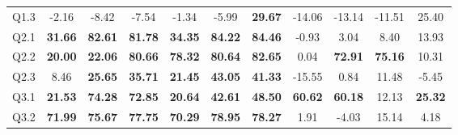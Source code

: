 \begin{table}
{\begin{tabular}{@{}ccccccccccc@{}}
    Q1.3                       & \multicolumn{1}{c}{-2.16}                     & \multicolumn{1}{c}{-8.42}                     & -7.54                     & \multicolumn{1}{c}{-1.34}                     & \multicolumn{1}{c}{-5.99}                     & \textbf{29.67}            & \multicolumn{1}{c}{-14.06}           & \multicolumn{1}{c}{-13.14}           & \multicolumn{1}{c}{-11.51}          & 25.40                           \\ 
    Q2.1                       & \multicolumn{1}{c}{\textbf{31.66}}            & \multicolumn{1}{c}{\textbf{82.61}}            & \textbf{81.78}            & \multicolumn{1}{c}{\textbf{34.35}}            & \multicolumn{1}{c}{\textbf{84.22}}            & \textbf{84.46}            & \multicolumn{1}{c}{-0.93}            & \multicolumn{1}{c}{3.04}             & \multicolumn{1}{c}{8.40}            & 13.93                           \\ 
    Q2.2                       & \multicolumn{1}{c}{\textbf{20.00}}            & \multicolumn{1}{c}{\textbf{22.06}}            & \textbf{80.66}            & \multicolumn{1}{c}{\textbf{78.32}}            & \multicolumn{1}{c}{\textbf{80.64}}            & \textbf{82.65}            & \multicolumn{1}{c}{0.04}             & \multicolumn{1}{c}{\textbf{72.91}}   & \multicolumn{1}{c}{\textbf{75.16}}  & 10.31                           \\ 
    Q2.3                       & \multicolumn{1}{c}{8.46}                      & \multicolumn{1}{c}{\textbf{25.65}}            & \textbf{35.71}            & \multicolumn{1}{c}{\textbf{21.45}}            & \multicolumn{1}{c}{\textbf{43.05}}            & \textbf{41.33}            & \multicolumn{1}{c}{-15.55}           & \multicolumn{1}{c}{0.84}             & \multicolumn{1}{c}{11.48}           & -5.45                           \\ 
    Q3.1                       & \multicolumn{1}{c}{\textbf{21.53}}            & \multicolumn{1}{c}{\textbf{74.28}}            & \textbf{72.85}            & \multicolumn{1}{c}{\textbf{20.64}}            & \multicolumn{1}{c}{\textbf{42.61}}            & \textbf{48.50}            & \multicolumn{1}{c}{\textbf{60.62}}   & \multicolumn{1}{c}{\textbf{60.18}}   & \multicolumn{1}{c}{12.13}           & \textbf{25.32}                  \\ 
    Q3.2                       & \multicolumn{1}{c}{\textbf{71.99}}            & \multicolumn{1}{c}{\textbf{75.67}}            & \textbf{77.75}            & \multicolumn{1}{c}{\textbf{70.29}}            & \multicolumn{1}{c}{\textbf{78.95}}            & \textbf{78.27}            & \multicolumn{1}{c}{1.91}             & \multicolumn{1}{c}{-4.03}            & \multicolumn{1}{c}{15.14}           & 4.18                            \\ 

\end{tabular}}
\end{table}
